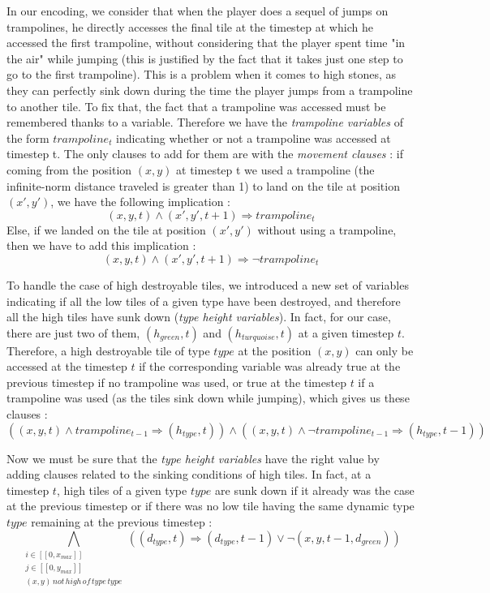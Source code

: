 \documentclass[a4paper, 12pt, titlepage]{article}
\begin{document}
In our encoding, we consider that when the player does a sequel of jumps on
trampolines, he directly accesses the final tile at the timestep at which he
accessed the first trampoline, without considering that the player spent time
"in the air" while jumping (this is justified by the fact that it takes just one
step to go to the first trampoline). This is a problem when it comes to high
stones, as they can perfectly sink down during the time the player jumps from a
trampoline to another tile. To fix that, the fact that a trampoline was accessed
must be remembered thanks to a variable. Therefore we have the {\em trampoline
variables} of the form $trampoline_t$ indicating whether or not a trampoline was
accessed at timestep t. The only clauses to add for them are with the
{\em movement clauses} : if coming from the position $(x, y)$ at timestep t we
used a trampoline (the infinite-norm distance traveled is greater than 1) to
land on the tile at position $(x', y')$, we have the following implication :
\begin{equation}
(x, y, t) \wedge (x', y', t+1) \Rightarrow trampoline_t
\end{equation}
Else, if we landed on the tile at position $(x', y')$ without using a
trampoline, then we have to add this implication :
\begin{equation}
(x, y, t) \wedge (x', y', t+1) \Rightarrow \neg trampoline_t
\end{equation}

To handle the case of high destroyable tiles, we introduced a new set of
variables indicating if all the low tiles of a given type have been destroyed,
and therefore all the high tiles have sunk down ({\em type height variables}).
In fact, for our case, there are just two of them, $(h_{green}, t)$ and
$(h_{turquoise}, t)$ at a given timestep $t$. Therefore, a high destroyable
tile of type $type$ at the position $(x, y)$ can only be accessed at the
timestep $t$ if the corresponding variable was already true at the previous
timestep if no trampoline was used, or true at the timestep $t$ if a trampoline
was used (as the tiles sink down while jumping), which gives us these clauses :
\begin{equation}
((x, y, t) \wedge trampoline_{t-1} \Rightarrow (h_{type}, t))
\wedge
((x, y, t) \wedge \neg trampoline_{t-1} \Rightarrow (h_{type}, t-1))
\end{equation}

Now we must be sure that the {\em type height variables} have the right value by
adding clauses related to the sinking conditions of high tiles. In fact, at a
timestep $t$, high tiles of a given type $type$ are sunk down if it already was
the case at the previous timestep or if there was no low tile having the same
dynamic type $type$ remaining at the previous timestep :
\begin{equation}
\bigwedge \limits_{\substack{i \in [\![0, x_{max}]\!]\\
			     j \in [\![0, y_{max}]\!]\\
			     (x, y) \, not \, high \, of \, type \, type}}
((d_{type}, t) \Rightarrow (d_{type}, t-1) \vee \neg(x, y, t-1, d_{green}))
\end{equation}
\end{document}
